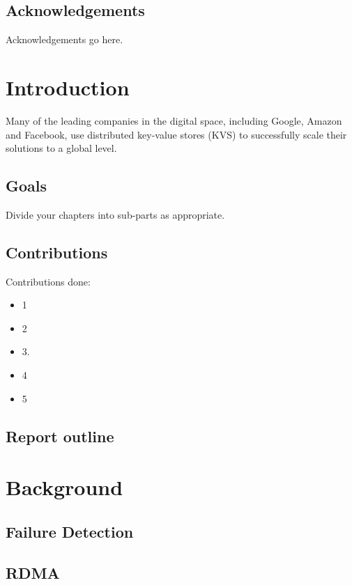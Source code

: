 \documentclass[bsc,frontabs,twoside,singlespacing,parskip,deptreport,hidel]{infthesis}     %
\begin{document}
\maketitle

\section*{Acknowledgements}
Acknowledgements go here. 

\tableofcontents



\chapter{Introduction}

Many of the leading companies in the digital space, including Google, Amazon and Facebook, use distributed key-value stores (KVS) to successfully scale their solutions to a global level.



\section{Goals}

Divide your chapters into sub-parts as appropriate.

\section{Contributions}
Contributions done:
\begin{itemize}
\item
1
\item
2
\item
3.
\item
4
\item
5
\end{itemize}

\section{Report outline}


\chapter{Background}
\section{Failure Detection}
\section{RDMA}
\end{document}
